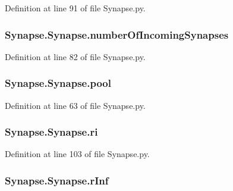 Definition at line 91 of file Synapse.\-py.

\hypertarget{class_synapse_1_1_synapse_a6e55e008336cc47551669f3d77248d57}{
\subsubsection[{number\-Of\-Incoming\-Synapses}]{\setlength{\rightskip}{0pt plus 5cm}Synapse.\-Synapse.\-number\-Of\-Incoming\-Synapses}}\label{class_synapse_1_1_synapse_a6e55e008336cc47551669f3d77248d57}


Definition at line 82 of file Synapse.\-py.

\hypertarget{class_synapse_1_1_synapse_a133990bf3ab7f1efa8b416be73d07a11}{
\subsubsection[{pool}]{\setlength{\rightskip}{0pt plus 5cm}Synapse.\-Synapse.\-pool}}\label{class_synapse_1_1_synapse_a133990bf3ab7f1efa8b416be73d07a11}


Definition at line 63 of file Synapse.\-py.

\hypertarget{class_synapse_1_1_synapse_adc85234a081ad18bf19473be530dcf78}{
\subsubsection[{ri}]{\setlength{\rightskip}{0pt plus 5cm}Synapse.\-Synapse.\-ri}}\label{class_synapse_1_1_synapse_adc85234a081ad18bf19473be530dcf78}


Definition at line 103 of file Synapse.\-py.

\hypertarget{class_synapse_1_1_synapse_afd263d49a97910efd8955a2aadef50e0}{
\subsubsection[{r\-Inf}]{\setlength{\rightskip}{0pt plus 5cm}Synapse.\-Synapse.\-r\-Inf}}\label{class_synapse_1_1_synapse_afd263d49a97910efd8955a2aadef50e0}


